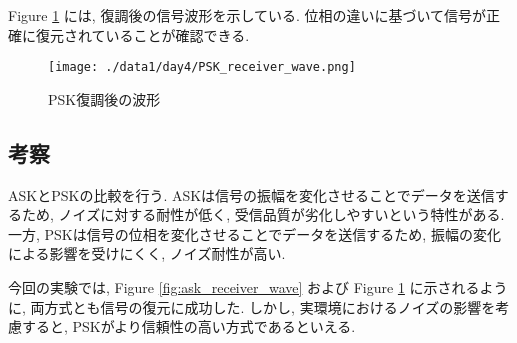 \documentclass[a4paper, twocolumn]{article} %
\begin{document}
Figure \ref{fig:psk_receiver_wave} には, 復調後の信号波形を示している. 位相の違いに基づいて信号が正確に復元されていることが確認できる.

\begin{figure}[H]
    \centering
    \texttt{[image: ./data1/day4/PSK\_receiver\_wave.png]}
    \caption{PSK復調後の波形}
    \label{fig:psk_receiver_wave}
\end{figure}

\subsection{考察}
ASKとPSKの比較を行う. ASKは信号の振幅を変化させることでデータを送信するため, ノイズに対する耐性が低く, 受信品質が劣化しやすいという特性がある. 一方, PSKは信号の位相を変化させることでデータを送信するため, 振幅の変化による影響を受けにくく, ノイズ耐性が高い.

今回の実験では, Figure \ref{fig:ask_receiver_wave} および Figure \ref{fig:psk_receiver_wave} に示されるように, 両方式とも信号の復元に成功した. しかし, 実環境におけるノイズの影響を考慮すると, PSKがより信頼性の高い方式であるといえる.
\end{document}
